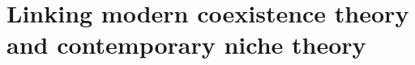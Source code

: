 \chapter{Linking modern coexistence theory and contemporary niche theory}
\fancyhead[LE, RO]{\thepage}
\fancyfoot{}
\renewcommand{\headrulewidth}{0pt}
\setlength{\parindent}{1cm}

